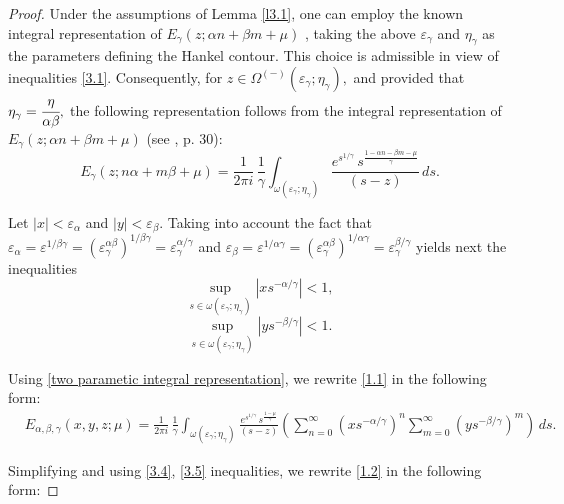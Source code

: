 \documentclass[12pt, reqno]{amsart}
\theoremstyle{definition}
\theoremstyle{remark}
\numberwithin{equation}{section}
\begin{document}
\begin{proof}
Under the assumptions of Lemma \ref{l3.1}, one can employ the known integral representation of
$E_{\gamma}(z;\alpha n+\beta m+\mu)$ , taking the above
$\varepsilon_{\gamma}$ and $\eta_{\gamma}$ as the parameters defining the Hankel contour.
This choice is admissible in view of inequalities \eqref{3.1}. Consequently, for
$
z\in\Omega^{(-)}(\varepsilon_{\gamma};\eta_{\gamma}),
$
and provided that
$
\eta_{\gamma}=\cfrac{\eta}{\alpha\beta},
$
the following representation follows from the integral representation of
$E_{\gamma}(z;\alpha n+\beta m+\mu)$ (see \cite{Podlubny}, p. 30):
\begin{equation}\label{two parametic integral representation}
E_{\gamma}(z;n\alpha+m\beta+\mu)
=
\frac{1}{2\pi i}\,
\frac{1}{\gamma}
\int_{\omega(\varepsilon_\gamma;\eta_\gamma)}
\frac{
e^{s^{1/\gamma}}
\,s^{\frac{1-\alpha n-\beta m-\mu}{\gamma}}
}
{
(s-z)
}
\,ds.
\end{equation}

Let $|x|<\varepsilon_{\alpha}$ and $|y|<\varepsilon_{\beta}$. Taking into account the fact that $\varepsilon_\alpha=\varepsilon^{1/\beta\gamma}=\left(\varepsilon_{\gamma}^{\alpha\beta}\right)^{1/\beta\gamma}=\varepsilon_{\gamma}^{\alpha/\gamma}$ and $\varepsilon_\beta=\varepsilon^{1/\alpha\gamma}=\left(\varepsilon_{\gamma}^{\alpha\beta}\right)^{1/\alpha\gamma}=\varepsilon_{\gamma}^{\beta/\gamma}$ yields next the inequalities
\begin{equation}\label{3.4}
\sup_{s\in\omega(\varepsilon_{\gamma};\eta_{\gamma})}
\left|xs^{-\alpha/\gamma}\right|<1,
\end{equation}
 \begin{equation}\label{3.5}
\sup_{s\in\omega(\varepsilon_{\gamma};\eta_{\gamma})}
\left|ys^{-\beta/\gamma}\right|<1.
\end{equation}

Using \eqref{two parametic integral representation}, we rewrite \eqref{1.1} in the following form:
\begin{equation}\label{1.2}
\begin{aligned}
&E_{\alpha,\beta,\gamma}(x,y,z;\mu)
=\frac{1}{2\pi i}\,
\frac{1}{\gamma}
\int_{\omega(\varepsilon_\gamma;\eta_\gamma)}
\frac{
e^{s^{1/\gamma}}
\,s^{\frac{1-\mu}{\gamma}}
}
{
(s-z)
}\left(\sum_{n=0}^{\infty}\left(xs^{-\alpha/\gamma}\right)^n\sum_{m=0}^{\infty}\left(ys^{-\beta/\gamma}\right)^m\right)
\,ds.
\end{aligned}\end{equation}


Simplifying and using \eqref{3.4}, \eqref{3.5} inequalities, we rewrite \eqref{1.2} in the following form:



\end{proof}
\end{document}
